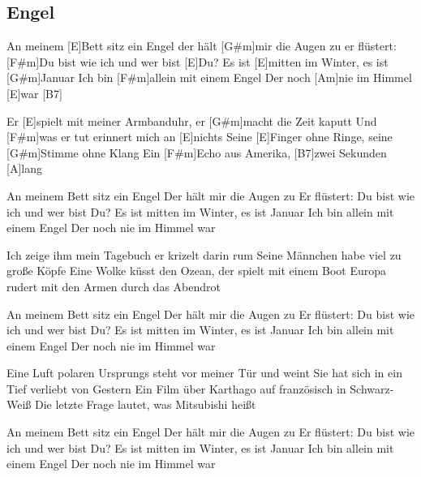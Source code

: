 \subsection*{Engel   }
\begin{guitar}

An meinem [E]Bett sitz ein Engel
der hält [G#m]mir die Augen zu
er flüstert: [F#m]Du bist wie ich und wer bist [E]Du?
Es ist [E]mitten im Winter, es ist [G#m]Januar
Ich bin [F#m]allein mit einem Engel
Der noch [Am]nie im Himmel [E]war   [B7] 



Er [E]spielt mit meiner Armbanduhr, er [G#m]macht die Zeit kaputt
Und [F#m]was er tut erinnert mich an [E]nichts
Seine [E]Finger ohne Ringe, seine [G#m]Stimme ohne Klang
Ein [F#m]Echo aus Amerika, [B7]zwei Sekunden [A]lang



An meinem Bett sitz ein Engel
Der hält mir die Augen zu
Er flüstert: Du bist wie ich und wer bist Du?
Es ist mitten im Winter, es ist Januar
Ich bin allein mit einem Engel
Der noch nie im Himmel war


Ich zeige ihm mein Tagebuch er krizelt darin rum
Seine Männchen habe viel zu große Köpfe
Eine Wolke küsst den Ozean, der spielt mit einem Boot
Europa rudert mit den Armen durch das Abendrot


An meinem Bett sitz ein Engel
Der hält mir die Augen zu
Er flüstert: Du bist wie ich und wer bist Du?
Es ist mitten im Winter, es ist Januar
Ich bin allein mit einem Engel
Der noch nie im Himmel war


Eine Luft polaren Ursprungs steht vor meiner Tür und weint
Sie hat sich in ein Tief verliebt von Gestern
Ein Film über Karthago auf französisch in Schwarz-Weiß
Die letzte Frage lautet, was Mitsubishi heißt


An meinem Bett sitz ein Engel
Der hält mir die Augen zu
Er flüstert: Du bist wie ich und wer bist Du?
Es ist mitten im Winter, es ist Januar
Ich bin allein mit einem Engel
Der noch nie im Himmel war 
\end{guitar}
